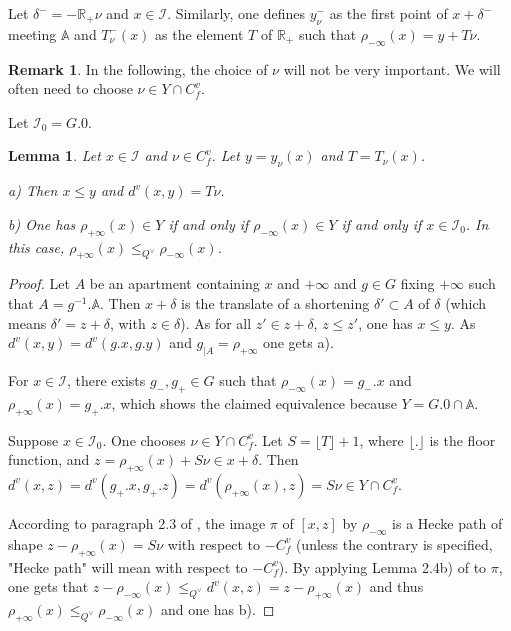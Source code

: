 \documentclass[12pt]{article}
\theoremstyle{plain}
\newtheorem{lemma}[theorem]{Lemma}
\theoremstyle{definition}
\newtheorem{rque}[theorem]{Remark}
\newcommand{\R}{\mathbb{R}}
\newcommand{\A}{\mathbb{A}}
\newcommand{\I}{\mathcal{I}}
\begin{document}
Let $\delta^-=-\R_+\nu$ and $x\in \I$. Similarly, one defines $y_\nu^-$ as the first point of $x+\delta^-$ meeting $\A$ and $T^-_\nu(x)$ as the element $T$ of $\R_+$ such that $\rho_{-\infty}(x)=y+T\nu$.

\begin{rque}
In the following, the choice of $\nu$ will not be very important. We will often need to choose $\nu\in Y\cap C^v_f$.
\end{rque}

Let $\I_0=G.0$.


\begin{lemma}\label{lemme distance vectorielle}
Let $x\in \mathcal{I}$ and $\nu\in C_f^v$. Let $y=y_\nu(x)$ and $T=T_\nu(x)$.

a)  Then $x\leq y$ and $d^v(x,y)=T\nu$.

b) One has $\rho_{+\infty}(x)\in Y$ if and only if $\rho_{-\infty}(x)\in Y$ if and only if $x\in \mathcal I_0$. In this case, $\rho_{+\infty}(x)\leq_{Q^\vee} \rho_{-\infty}(x)$.


\end{lemma}


\begin{proof} Let $A$ be an apartment containing $x$ and $+\infty$ and $g\in G$ fixing $+\infty$ such that $A=g^{-1}.\A$. Then $x+\delta$ is the translate of a shortening $\delta'\subset A$ of $\delta$ (which means $\delta'=z+\delta$, with $z\in \delta$). As for all $z'\in z+\delta$, $z\leq z'$, one has $x\leq y$. As $d^v(x,y)=d^v(g.x,g.y)$ and $g_{|A}=\rho_{+\infty}$ one gets a).

For $x\in\mathcal{I}$, there exists $g_-,g_+\in G$ such that $\rho_{-\infty}(x)=g_-.x$ and $\rho_{+\infty}(x)=g_+.x$, which shows the claimed equivalence because $Y=G.0\cap \mathbb{A}$.

Suppose $x\in \mathcal{I}_0$. One chooses $\nu\in Y\cap C_f^v$. Let $S=\lfloor T\rfloor +1$, where $\lfloor.\rfloor$ is the floor function, and $z=\rho_{+\infty}(x)+S\nu\in x+\delta$. Then $d^v(x,z)=d^v(g_+.x,g_+.z)=d^v(\rho_{+\infty}(x),z)=S\nu\in Y\cap C^v_f$.

According to paragraph 2.3 of \cite{gaussent2014spherical}, the image $\pi$ of $[x,z]$ by $\rho_{-\infty}$ is a Hecke path of shape $z-\rho_{+\infty}(x)=S\nu$ with respect to $-C^v_f$ (unless the contrary is specified, "Hecke path" will mean with respect to $-C^v_f$). By applying Lemma 2.4b) of \cite{gaussent2014spherical} to $\pi$, one gets that $z-\rho_{-\infty}(x)\leq _{Q^\vee} d^v(x,z)=z-\rho_{+\infty}(x)$ and thus $\rho_{+\infty}(x)\leq_{Q^\vee} \rho_{-\infty}(x)$ and one has b).  
\end{proof}
\end{document}
